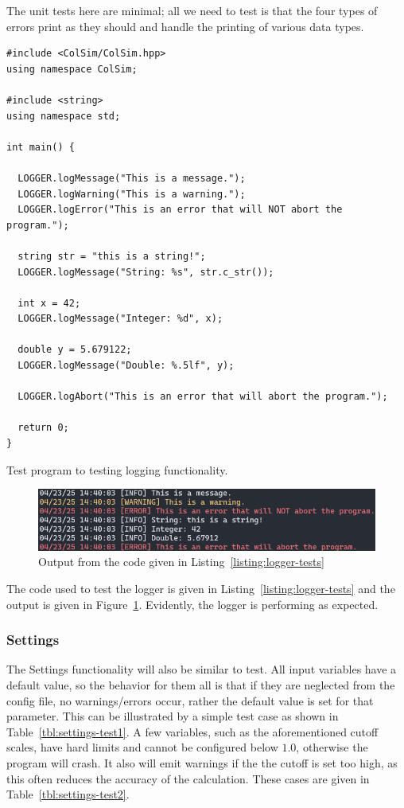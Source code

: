 The unit tests here are minimal; all we need to test is that the four types of errors print as they should and handle the printing of various data types.

\begin{listing}
  \begin{verbatim}
#include <ColSim/ColSim.hpp>
using namespace ColSim;

#include <string>
using namespace std;

int main() {

  LOGGER.logMessage("This is a message.");
  LOGGER.logWarning("This is a warning.");
  LOGGER.logError("This is an error that will NOT abort the program.");

  string str = "this is a string!";
  LOGGER.logMessage("String: %s", str.c_str());

  int x = 42;
  LOGGER.logMessage("Integer: %d", x);

  double y = 5.679122;
  LOGGER.logMessage("Double: %.5lf", y);

  LOGGER.logAbort("This is an error that will abort the program.");

  return 0;
}
  \end{verbatim}
  \caption{Test program to testing logging functionality.}
  \label{listing:logger-tests}
\end{listing}

\begin{figure}[ht]
  \centering
  \includegraphics[width=0.7\linewidth]{./res/gfx/logger-tests.png}
  \caption{Output from the code given in Listing~\ref{listing:logger-tests}}
  \label{fig:logger-tests}
\end{figure}

The code used to test the logger is given in Listing~\ref{listing:logger-tests} and the output is given in Figure~\ref{fig:logger-tests}. Evidently, the logger is performing as expected.

\subsubsection{Settings}

The Settings functionality will also be similar to test. All input variables have a default value, so the behavior for them all is that if they are neglected from the config file, no warnings/errors occur, rather the default value is set for that parameter. This can be illustrated by a simple test case as shown in Table~\ref{tbl:settings-test1}. A few variables, such as the aforementioned cutoff scales, have hard limits and cannot be configured below $1.0$, otherwise the program will crash. It also will emit warnings if the the cutoff is set too high, as this often reduces the accuracy of the calculation. These cases are given in Table~\ref{tbl:settings-test2}.

